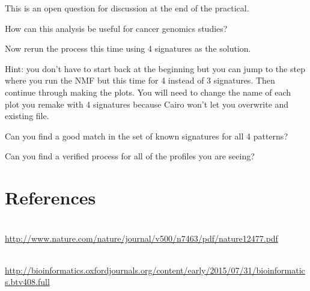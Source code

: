 \begin{questions}
This is an open question for discussion at the end of the practical.

How can this analysis be useful for cancer genomics studies?
\end{questions}

\begin{advanced}
Now rerun the process this time using 4 signatures as the solution.
\vspace{4 mm}
\begin{information}
Hint: you don't have to start back at the beginning but you can jump
to the step where you run the NMF but this time for 4 instead of 3
signatures. Then continue through making the plots.
\vspace{4 mm}
You will need to change the name of each plot you remake with 4
signatures because Cairo won't let you overwrite and existing file.
\end{information}
\begin{questions}
Can you find a good match in the set of known signatures for all 4 patterns? 

Can you find a verified process for all of the profiles you are seeing? 
\end{questions}
\end{advanced}


\section{References}

\begin{description}[style=multiline,labelindent=0cm,align=left,leftmargin=1cm]
 \item[Alexandrov et al. Nature 2013] \hfill\\
  \url{http://www.nature.com/nature/journal/v500/n7463/pdf/nature12477.pdf}
 \item[Gehring et al. Bioinformatics 2015] \hfill\\
  \url{http://bioinformatics.oxfordjournals.org/content/early/2015/07/31/bioinformatics.btv408.full}
\end{description}

